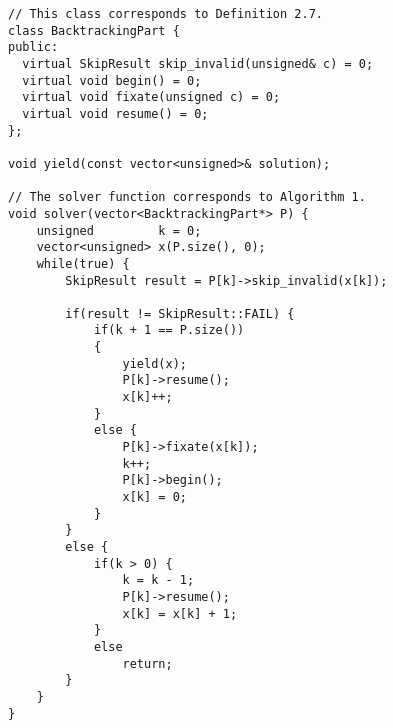 \begin{lstlisting}[language=MyCpp,
                   label={cppsolver},caption=
  {Complete C++ implementation of \Cref{backtrackalg}:
    The if-else statements in lines 19--41 precisely correspond to those
    in lines 5--17 of that algorithm.
    The \texttt{BacktrackingPart} objects iterate over $\protect{B_k[C](M,x)}$ via the
    \texttt{skip\_invalid} method.
    The remaining member function calls in lines
    $\text{23},\text{27},\text{29},\text{36}$ precompute structures that are
    used in \texttt{skip\_invalid} for quick evaluation.}]
// This class corresponds to Definition 2.7.
class BacktrackingPart {
public:
  virtual SkipResult skip_invalid(unsigned& c) = 0;
  virtual void begin() = 0;
  virtual void fixate(unsigned c) = 0;
  virtual void resume() = 0;
};

void yield(const vector<unsigned>& solution);

// The solver function corresponds to Algorithm 1.
void solver(vector<BacktrackingPart*> P) {
    unsigned         k = 0;
    vector<unsigned> x(P.size(), 0);
    while(true) {
        SkipResult result = P[k]->skip_invalid(x[k]);

        if(result != SkipResult::FAIL) {
            if(k + 1 == P.size())
            {
                yield(x);
                P[k]->resume();
                x[k]++;
            }
            else {
                P[k]->fixate(x[k]);
                k++;
                P[k]->begin();
                x[k] = 0;
            }
        }
        else {
            if(k > 0) {
                k = k - 1;
                P[k]->resume();
                x[k] = x[k] + 1;
            }
            else
                return;
        }
    }
}
\end{lstlisting}
